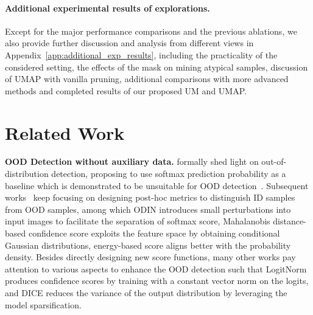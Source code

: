 \documentclass{article}
\theoremstyle{plain}
\theoremstyle{definition}
\theoremstyle{remark}
\begin{document}
\paragraph{Additional experimental results of explorations.} 
Except for the major performance comparisons and the previous ablations, we also provide further discussion and analysis from different views in Appendix~\ref{app:additional_exp_results}, including the practicality of the considered setting, the effects of the mask on mining atypical samples, discussion of UMAP with vanilla pruning, additional comparisons with more advanced methods and completed results of our proposed UM and UMAP.


\section{Related Work}

\textbf{OOD Detection without auxiliary data.} \citet{hendrycks17baseline} formally shed light on out-of-distribution detection, proposing to use softmax prediction probability as a baseline which is demonstrated to be unsuitable for OOD detection~\citep{hendrycks2018deep}. Subsequent works~\citep{sun2021react} keep focusing on designing post-hoc metrics to distinguish ID samples from OOD samples, among which ODIN \citep{LiangLS18} introduces small perturbations into input images to facilitate the separation of softmax score, Mahalanobis distance-based confidence score \citep{10.5555/3327757.3327819} exploits the feature space by obtaining conditional Gaussian distributions, energy-based score \citep{liu2020energy} aligns better with the probability density. Besides directly designing new score functions, many other works pay attention to various aspects to enhance the OOD detection such that LogitNorm \citep{wei2022logitnorm} produces confidence scores by training with a constant vector norm on the logits, and DICE \citep{sun2022dice} reduces the variance of the output distribution by leveraging the model sparsification.
\end{document}
